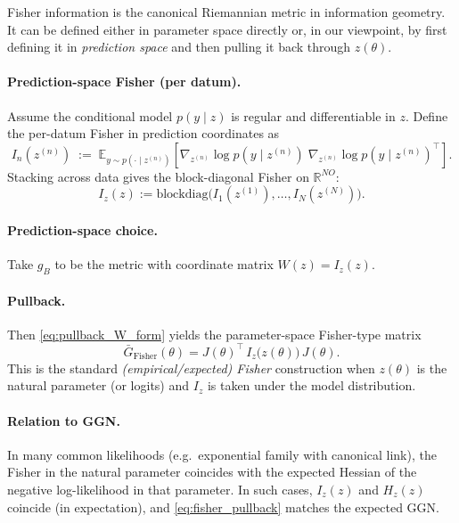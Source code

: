 Fisher information is the canonical Riemannian metric in information geometry.
It can be defined either in parameter space directly or, in our viewpoint, by first defining it in
\emph{prediction space} and then pulling it back through $z(\theta)$.

\paragraph{Prediction-space Fisher (per datum).}
Assume the conditional model $p(y\mid z)$ is regular and differentiable in $z$.
Define the per-datum Fisher in prediction coordinates as
\[
I_n(z^{(n)})
\;:=\;
\mathbb E_{y\sim p(\cdot\mid z^{(n)})}\!\left[
\nabla_{z^{(n)}}\log p(y\mid z^{(n)})\;
\nabla_{z^{(n)}}\log p(y\mid z^{(n)})^\top
\right].
\]
Stacking across data gives the block-diagonal Fisher on $\mathbb R^{NO}$:
\[
I_z(z)
:=
\mathrm{blockdiag}\bigl(I_1(z^{(1)}),\dots,I_N(z^{(N)})\bigr).
\]

\paragraph{Prediction-space choice.}
Take $g_B$ to be the metric with coordinate matrix $W(z)=I_z(z)$.

\paragraph{Pullback.}
Then \eqref{eq:pullback_W_form} yields the parameter-space Fisher-type matrix
\begin{equation}
\bar G_{\mathrm{Fisher}}(\theta)
=
J(\theta)^\top\,I_z\bigl(z(\theta)\bigr)\,J(\theta).
\label{eq:fisher_pullback}
\end{equation}
This is the standard \emph{(empirical/expected) Fisher} construction when $z(\theta)$ is the natural
parameter (or logits) and $I_z$ is taken under the model distribution.

\paragraph{Relation to GGN.}
In many common likelihoods (e.g.\ exponential family with canonical link), the Fisher in the natural
parameter coincides with the expected Hessian of the negative log-likelihood in that parameter.
In such cases, $I_z(z)$ and $H_z(z)$ coincide (in expectation), and \eqref{eq:fisher_pullback} matches
the expected GGN.


